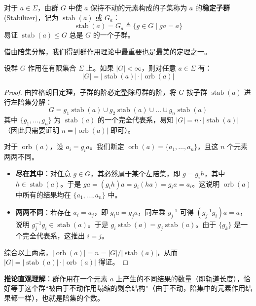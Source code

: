 \documentclass[11pt]{article}
\begin{document}
\begin{cndefinition}
    对于 $a \in \Sigma$，由群 $G$ 中使 $a$ 保持不动的元素构成的子集称为 $a$ 的\textbf{稳定子群} (Stabilizer)，记为 $\operatorname{stab}(a)$ 或 $G_a$：
    \[
    \operatorname{stab}(a) = G_a \triangleq \{g \in G \mid ga = a\}
    \]
    易证 $\operatorname{stab}(a) \le G$ 总是 $G$ 的一个子群。
\end{cndefinition}

借由陪集分解，我们得到群作用理论中最重要也是最美的定理之一。

\begin{cntheorem}
    设群 $G$ 作用在有限集合 $\Sigma$ 上。如果 $|G| < \infty$，则对任意 $a \in \Sigma$ 有：
    \[
    |G| = |\operatorname{stab}(a)| \cdot |\operatorname{orb}(a)|
    \]
\end{cntheorem}

\begin{proof}
    由拉格朗日定理，子群的阶必定整除母群的阶，将 $G$ 按子群 $\operatorname{stab}(a)$ 进行左陪集分解：
    \[
    G = g_1 \operatorname{stab}(a) \cup g_2 \operatorname{stab}(a) \cup \dots \cup g_n \operatorname{stab}(a)
    \]
    其中 $\{g_1, \dots, g_n\}$ 为 $\operatorname{stab}(a)$ 的一个完全代表系，易知 $|G| = n \cdot |\operatorname{stab}(a)|$（因此只需要证明 $n = |\operatorname{orb}(a)|$ 即可）。
    
    对于 $\operatorname{orb}(a)$，设 $a_i = g_i a$。我们断定 $\operatorname{orb}(a) = \{a_1, \dots, a_n\}$，且这 $n$ 个元素两两不同。
    \begin{itemize}
        \item \textbf{尽在其中}：对任意 $g \in G$，其必然属于某个左陪集，即 $g = g_i h$，其中 $h \in \operatorname{stab}(a)$。于是 $ga = (g_i h)a = g_i (ha) = g_i a = a_i$。这说明 $\operatorname{orb}(a)$ 中所有的结果均在 $\{a_1, \dots, a_n\}$ 中。
        \item \textbf{两两不同}：若存在 $a_i = a_j$，即 $g_i a = g_j a$，同左乘 $g_j^{-1}$ 可得 $(g_j^{-1}g_i)a = a$，说明 $g_j^{-1}g_i \in \operatorname{stab}(a)$。于是 $g_i \operatorname{stab}(a) = g_j \operatorname{stab}(a)$。由于 $\{g_k\}$ 是一个完全代表系，这推出 $i=j$。
    \end{itemize}
    综合以上两点，$|\operatorname{orb}(a)| = n = |G| / |\operatorname{stab}(a)|$，从而 $|G| = |\operatorname{stab}(a)| \cdot |\operatorname{orb}(a)|$ 得证。
\end{proof}

\textbf{推论直观理解}：群作用在一个元素 $a$ 上产生的不同结果的数量（即轨道长度），恰好等于这个群“被由于不动作用塌缩的剩余结构”（由于不动，陪集中的元素作用结果都一样），也就是陪集的个数。
\end{document}
